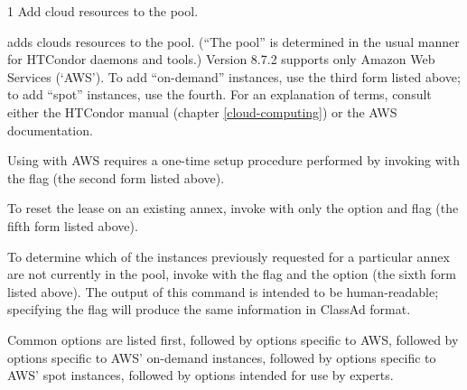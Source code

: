 \begin{ManPage}{\label{man-condor-annex}}{1}
{Add cloud resources to the pool.}

\Synopsis

 

 

 

 



\Description

 adds clouds resources to the pool.  (``The pool'' is determined
in the usual manner for HTCondor daemons and tools.)  Version 8.7.2 supports
only Amazon Web Services (`AWS').  To add ``on-demand'' instances, use
the third form listed above; to add ``spot'' instances, use the fourth.  For an
explanation of terms, consult either the HTCondor manual
(chapter \ref{cloud-computing}) or the AWS documentation.

Using  with AWS requires a one-time setup procedure
performed by invoking  with the  flag
(the second form listed above).

To reset the lease on an existing annex, invoke  with
only the  option and  flag (the fifth form
listed above).

To determine which of the instances previously requested for a
particular annex are not currently in the pool, invoke 
with the  flag and the  option (the sixth
form listed above).  The output of this command is intended to be
human-readable; specifying the  flag will produce the
same information in ClassAd format.

Common options are listed first, followed by options specific to AWS,
followed by options specific to AWS' on-demand instances, followed by
options specific to AWS' spot instances, followed by options intended
for use by experts.


\end{ManPage}
